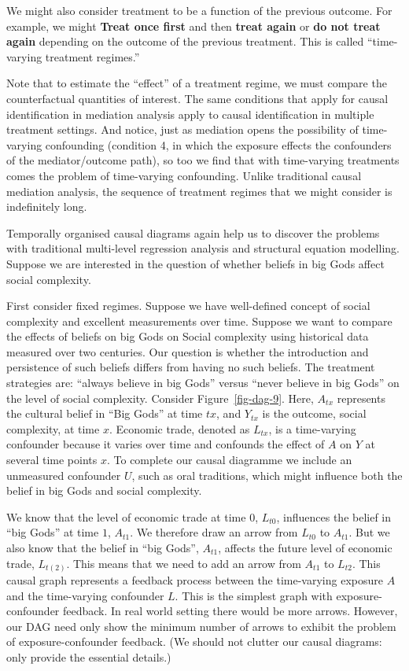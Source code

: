 \documentclass[
  singlecolumn]{report}
\begin{document}
We might also consider treatment to be a function of the previous
outcome. For example, we might \textbf{Treat once first} and then
\textbf{treat again} or \textbf{do not treat again} depending on the
outcome of the previous treatment. This is called ``time-varying
treatment regimes.''

Note that to estimate the ``effect'' of a treatment regime, we must
compare the counterfactual quantities of interest. The same conditions
that apply for causal identification in mediation analysis apply to
causal identification in multiple treatment settings. And notice, just
as mediation opens the possibility of time-varying confounding
(condition 4, in which the exposure effects the confounders of the
mediator/outcome path), so too we find that with time-varying treatments
comes the problem of time-varying confounding. Unlike traditional causal
mediation analysis, the sequence of treatment regimes that we might
consider is indefinitely long.

Temporally organised causal diagrams again help us to discover the
problems with traditional multi-level regression analysis and structural
equation modelling. Suppose we are interested in the question of whether
beliefs in big Gods affect social complexity.

First consider fixed regimes. Suppose we have well-defined concept of
social complexity and excellent measurements over time. Suppose we want
to compare the effects of beliefs on big Gods on Social complexity using
historical data measured over two centuries. Our question is whether the
introduction and persistence of such beliefs differs from having no such
beliefs. The treatment strategies are: ``always believe in big Gods''
versus ``never believe in big Gods'' on the level of social complexity.
Consider Figure~\ref{fig-dag-9}. Here, \(A_{tx}\) represents the
cultural belief in ``Big Gods'' at time \(tx\), and \(Y_{tx}\) is the
outcome, social complexity, at time \(x\). Economic trade, denoted as
\(L_{tx}\), is a time-varying confounder because it varies over time and
confounds the effect of \(A\) on \(Y\) at several time points \(x\). To
complete our causal diagramme we include an unmeasured confounder \(U\),
such as oral traditions, which might influence both the belief in big
Gods and social complexity.

We know that the level of economic trade at time \(0\), \(L_{t0}\),
influences the belief in ``big Gods'' at time \(1\), \(A_{t1}\). We
therefore draw an arrow from \(L_{t0}\) to \(A_{t1}\). But we also know
that the belief in ``big Gods'', \(A_{t1}\), affects the future level of
economic trade, \(L_{t(2)}\). This means that we need to add an arrow
from \(A_{t1}\) to \(L_{t2}\). This causal graph represents a feedback
process between the time-varying exposure \(A\) and the time-varying
confounder \(L\). This is the simplest graph with exposure-confounder
feedback. In real world setting there would be more arrows. However, our
DAG need only show the minimum number of arrows to exhibit the problem
of exposure-confounder feedback. (We should not clutter our causal
diagrams: only provide the essential details.)
\end{document}
